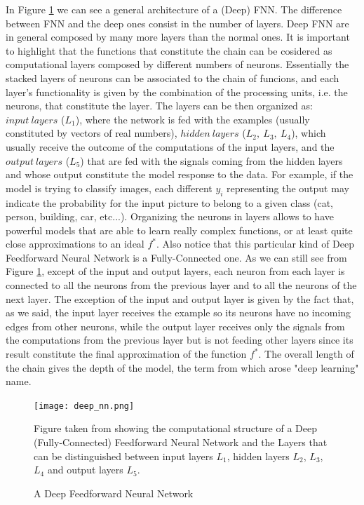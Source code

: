 In Figure \ref{fig:deep_nn} we can see a general architecture of a (Deep) FNN. The difference between FNN and the deep ones consist in the number of layers. Deep FNN are in general composed by many more layers than the normal ones. It is important to highlight that the functions that constitute the chain can be cosidered as computational layers composed by different numbers of neurons. Essentially the stacked layers of neurons can be associated to the chain of funcions, and each layer's functionality is given by the combination of the processing units, i.e. the neurons, that constitute the layer. The layers can be then organized as: \(input \: layers\) (\(L_1\)), where the network is fed with the examples (usually constituted by vectors of real numbers), \(hidden \: layers\) (\(L_2, \: L_3, \: L_4\)), which usually receive the outcome of the computations of the input layers, and the \(output \: layers\) (\(L_5\)) that are fed with the signals coming from the hidden layers and whose output constitute the model response to the data. For example, if the model is trying to classify images, each different \(y_i\) representing the output may indicate the probability for the input picture to belong to a given class (cat, person, building, car, etc...). Organizing the neurons in layers allows to have powerful models that are able to learn really complex functions, or at least quite close approximations to an ideal \(f^*\). Also notice that this particular kind of Deep Feedforward Neural Network is a Fully-Connected one. As we can still see from Figure \ref{fig:deep_nn}, except of the input and output layers, each neuron from each layer is connected to all the neurons from the previous layer and to all the neurons of the next layer. The exception of the input and output layer is given by the fact that, as we said, the input layer receives the example so its neurons have no incoming edges from other neurons, while the output layer receives only the signals from the computations from the previous layer but is not feeding other layers since its result constitute the final approximation of the function \(f^*\).
The overall length of the chain gives the depth of the model, the term from which arose "deep learning"  name. 

\begin{figure}
\centering
\texttt{[image: deep\_nn.png]}
\caption{A Deep Feedforward Neural Network}
Figure taken from \cite{deep_nn} showing the computational structure of a Deep (Fully-Connected) Feedforward Neural Network and the Layers that can be distinguished between input layers \(L_1\), hidden layers \(L_2\), \(L_3\),\(L_4\) and output layers \(L_5\). 
\label{fig:deep_nn}
\end{figure}

